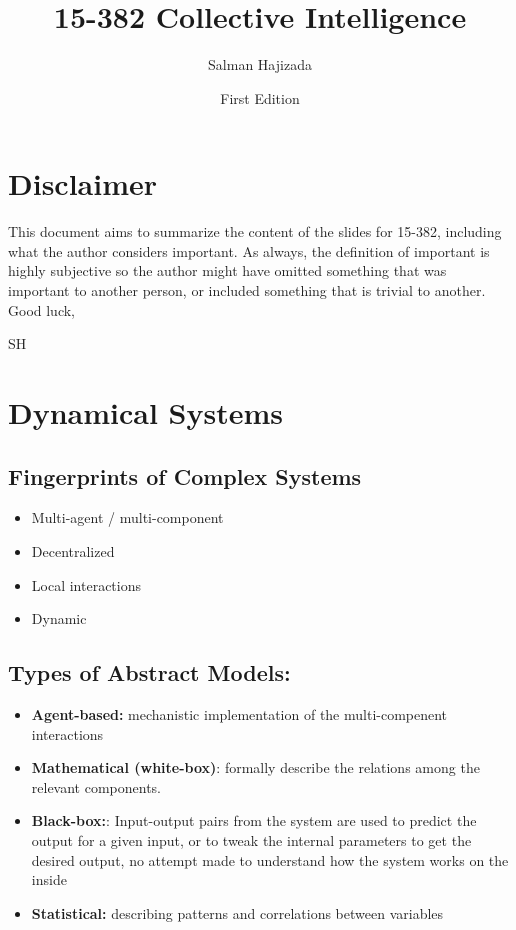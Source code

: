 \documentclass{report}
\title{15-382 Collective Intelligence}
\date{First Edition}
\author{Salman Hajizada}
\begin{document}
\maketitle

\setcounter{chapter}{-1}
\chapter*{Disclaimer}
This document aims to summarize the content of the slides for 15-382, including
what the author considers important. As always, the definition of important is
highly subjective so the author might have omitted something that was
important to another person, or included something that is trivial to another.\\

Good luck,

SH

\chapter*{Dynamical Systems}

\section*{Fingerprints of Complex Systems}

\begin{itemize}
    \item Multi-agent / multi-component
    \item Decentralized
    \item Local interactions
    \item Dynamic
\end{itemize}

\section*{Types of Abstract Models:}

\begin{itemize}
    \item \textbf{Agent-based:} mechanistic implementation of the multi-compenent interactions
    \item \textbf{Mathematical (white-box)}: formally describe the relations among the relevant components.
    \item \textbf{Black-box:}: Input-output pairs from the system are used to predict the output for a given input, or to tweak the internal parameters to get the desired output, no attempt made to understand how the system works on the inside
    \item \textbf{Statistical:} describing patterns and correlations between variables
\end{itemize}
\end{document}
